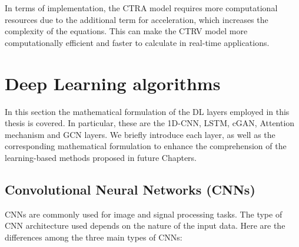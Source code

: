 In terms of implementation, the \ac{CTRA} model requires more computational resources due to the additional term for acceleration, which increases the complexity of the equations. This can make the \ac{CTRV} model more computationally efficient and faster to calculate in real-time applications. 

\section{Deep Learning algorithms}
\label{sec:3_dlb_formulation}

In this section the mathematical formulation of the \ac{DL} layers employed in this thesis is covered. In particular, these are the 1D-\ac{CNN}, \ac{LSTM}, \ac{cGAN}, Attention mechanism and \ac{GCN} layers. We briefly introduce each layer, as well as the corresponding mathematical formulation to enhance the comprehension of the learning-based methods proposed in future Chapters.

\subsection{Convolutional Neural Networks (CNNs)}
\label{subsec:3_cnns}



\acp{CNN} are commonly used for image and signal processing tasks. The type of CNN architecture used depends on the nature of the input data. Here are the differences among the three main types of \acp{CNN}:

